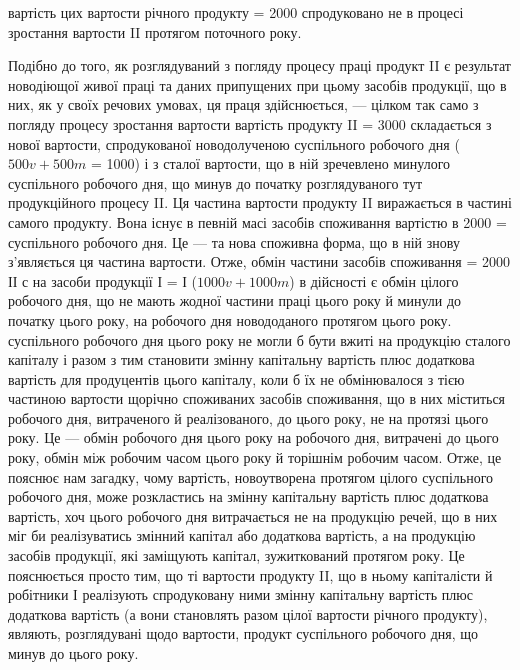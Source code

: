 \parcont{}  %
вартість цих  вартости річного продукту = 2000 спродуковано не
в процесі зростання вартости II протягом поточного року.

Подібно до того, як розглядуваний з погляду процесу праці продукт
II є результат новодіющої живої праці та даних припущених при цьому
засобів продукції, що в них, як у своїх речових умовах, ця праця здійснюється,
— цілком так само з погляду процесу зростання вартости вартість
продукту II = 3000 складається з нової вартости, спродукованої новодолученою
 суспільного робочого дня ($500 v + 500m$ = 1000) і з сталої
вартости, що в ній зречевлено  минулого суспільного робочого дня,
що минув до початку розглядуваного тут продукційного процесу II. Ця
частина вартости продукту II виражається в частині самого продукту.
Вона існує в певній масі засобів споживання вартістю в 2000 =  суспільного
робочого дня. Це — та нова споживна форма, що в ній знову
з’являється ця частина вартости. Отже, обмін частини засобів споживання =
2000 ІІ с на засоби продукції І = І ($1000 v + 1000 m$) в дійсності є обмін
 цілого робочого дня, що не мають жодної частини праці цього року
й минули до початку цього року, на  робочого дня новододаного протягом
цього року.  суспільного робочого дня цього року не могли б
бути вжиті на продукцію сталого капіталу і разом з тим становити змінну
капітальну вартість плюс додаткова вартість для продуцентів цього капіталу,
коли б їх не обмінювалося з тією частиною вартости щорічно
споживаних засобів споживання, що в них міститься  робочого дня,
витраченого й реалізованого, до цього року, не на протязі цього
року. Це — обмін  робочого дня цього року на  робочого дня,
витрачені до цього року, обмін між робочим часом цього року й
торішнім робочим часом. Отже, це пояснює нам загадку, чому вартість,
новоутворена протягом цілого суспільного робочого дня, може розкластись
на змінну капітальну вартість плюс додаткова вартість, хоч
 цього робочого дня витрачається не на продукцію речей, що в
них міг би реалізуватись змінний капітал або додаткова вартість, а
на продукцію засобів продукції, які заміщують капітал, зужиткований
протягом року. Це пояснюється просто тим, що ті  вартости продукту
II, що в ньому капіталісти й робітники І реалізують спродуковану
ними змінну капітальну вартість плюс додаткова вартість (а вони
становлять разом  цілої вартости річного продукту), являють, розглядувані
щодо вартости, продукт  суспільного робочого дня, що
минув до цього року.

